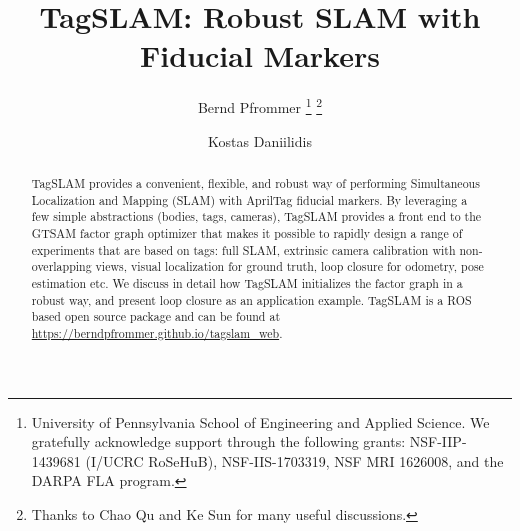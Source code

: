 \documentclass[letterpaper, 10 pt]{IEEEconf}
\begin{document}
\title{\LARGE \bf TagSLAM: Robust SLAM with Fiducial Markers}
\author{
Bernd Pfrommer
\footnote{University of Pennsylvania School of Engineering and Applied
Science. We gratefully acknowledge support through the following grants: NSF-IIP-1439681
(I/UCRC RoSeHuB), NSF-IIS-1703319, NSF MRI 1626008, and the DARPA FLA
program.}
\footnote{Thanks to Chao Qu and Ke Sun for many useful discussions.}
\\
\and
Kostas Daniilidis\footnotemark[1]
}

\maketitle
\begin{abstract}
TagSLAM provides a convenient, flexible, and robust way of performing
Simultaneous Localization and Mapping (SLAM) with AprilTag fiducial
markers. By leveraging a few simple abstractions (bodies, tags,
cameras), TagSLAM provides a front end to the GTSAM factor graph
optimizer that makes it possible to rapidly design a range of
experiments that are based on tags: full SLAM, extrinsic camera
calibration with non-overlapping views, visual localization for ground
truth, loop closure for odometry, pose estimation etc. We discuss in
detail how TagSLAM initializes the factor graph in a robust way, and
present loop closure as an application example.  TagSLAM is a ROS
based open source package and can be found
at \url{https://berndpfrommer.github.io/tagslam_web}.
\end{abstract}







\balance


\end{document}
